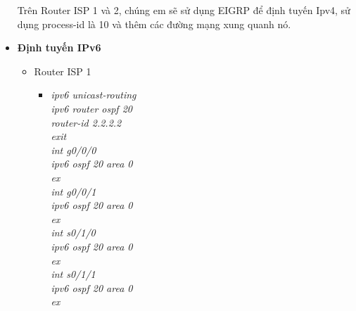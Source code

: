 \documentclass[a4paper, 12pt]{article}
\begin{document}
\begin{itemize}
\begin{itemize}
\begin{itemize}
          \end{itemize}
       \end{itemize}
     \hspace*{1cm} Trên Router ISP 1 và 2, chúng em sẽ sử dụng EIGRP để định tuyến Ipv4, sử dụng process-id là 10 và thêm các đường mạng xung quanh nó.\\
       \item \textbf{Định tuyến IPv6}
      \begin{itemize}
        \item Router ISP 1
        \begin{itemize}
          \item \textit{ipv6 unicast-routing\\
                    	ipv6 router ospf 20\\
                    	router-id 2.2.2.2\\
                    	exit\\
                    	int g0/0/0\\
                    	ipv6 ospf 20 area 0\\
                    	ex\\
                    	int g0/0/1\\
                    	ipv6 ospf 20 area 0\\
                    	ex\\
                    	int s0/1/0\\
                    	ipv6 ospf 20 area 0\\
                    	ex\\
                    	int s0/1/1\\
                    	ipv6 ospf 20 area 0\\
                    	ex\\}
       

\end{itemize}
\end{itemize}
\end{itemize}
\end{document}
